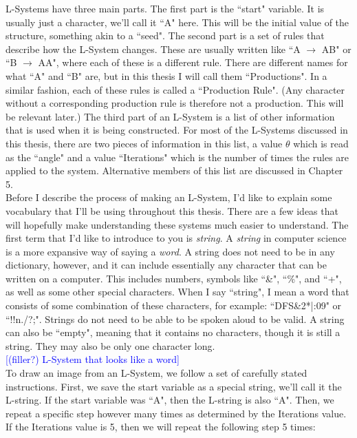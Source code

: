 \documentclass[12pt,twoside]{reedthesis}
\begin{document}
	L-Systems have three main parts. The first part is the ``start" variable. It is usually just a character, we'll call it ``A" here. This will be the initial value of the structure, something akin to a ``seed". The second part is a set of rules that describe how the L-System changes. These are usually written like ``A $\rightarrow$ AB" or ``B $\rightarrow$ AA", where each of these is a different rule. There are different names for what ``A" and ``B" are, but in this thesis I will call them ``Productions". In a similar fashion, each of these rules is called a ``Production Rule". (Any character without a corresponding production rule is therefore not a production. This will be relevant later.) The third part of an L-System is a list of other information that is used when it is being constructed. For most of the L-Systems discussed in this thesis, there are two pieces of information in this list, a value $\theta$ which is read as the ``angle" and a value ``Iterations" which is the number of times the rules are applied to the system. Alternative members of this list are discussed in Chapter 5.\\

	Before I describe the process of making an L-System, I'd like to explain some vocabulary that I'll be using throughout this thesis. There are a few ideas that will hopefully make understanding these systems much easier to understand. The first term that I'd like to introduce to you is \textit{string}. A \textit{string} in computer science is a more expansive way of saying a \textit{word}. A string does not need to be in any dictionary, however, and it can include essentially any character that can be written on a computer. This includes numbers, symbols like ``\&", ``\%", and ``+", as well as some other special characters. When I say ``string", I mean a word that consists of some combination of these characters, for example: ``DFS\&2*|:09" or ``!!n./?;". Strings do not need to be able to be spoken aloud to be valid. A string can also be ``empty", meaning that it contains no characters, though it is still a string. They may also be only one character long. \\
	
	\textcolor{blue}{[(filler?) L-System that looks like a word]}\\
	
	To draw an image from an L-System, we follow a set of carefully stated instructions. First, we save the start variable as a special string, we'll call it the L-string. If the start variable was ``A", then the L-string is also ``A". Then, we repeat a specific step however many times as determined by the Iterations value. If the Iterations value is 5, then we will repeat the following step 5 times:\\
	
\end{document}
